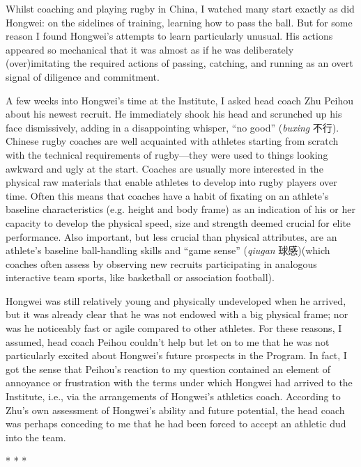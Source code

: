 \begin{CJK}{UTF8}{gbsn}
Whilst coaching and playing rugby in China, I watched many start exactly as did Hongwei: on the sidelines of training, learning how to pass the ball.  But for some reason I found Hongwei’s attempts to learn particularly unusual.  His actions appeared so mechanical that it was almost as if he was deliberately (over)imitating the required actions of passing, catching, and running as an overt signal of diligence and commitment.

A few weeks into Hongwei’s time at the Institute, I asked head coach Zhu Peihou about his newest recruit.  He immediately shook his head and scrunched up his face dismissively, adding in a disappointing whisper, ``no good'' (\textit{buxing} 不行).  Chinese rugby coaches are well acquainted with athletes starting from scratch with the technical requirements of rugby---they were used to things looking awkward and ugly at the start.  Coaches are usually more interested in the physical raw materials that enable athletes to develop into rugby players over time.  Often this means that coaches have a habit of fixating on an athlete's baseline characteristics (e.g. height and body frame) as an indication of his or her capacity to develop the physical speed, size and strength deemed crucial for elite performance.  Also important, but less crucial than physical attributes, are an athlete’s baseline ball-handling skills and ``game sense'' (\textit{qiugan} 球感)(which coaches often assess by observing new recruits participating in analogous interactive team sports, like basketball or association football).

Hongwei was still relatively young and physically undeveloped when he arrived, but it was already clear that he was not endowed with a big physical frame; nor was he noticeably fast or agile compared to other athletes.  For these reasons, I assumed, head coach Peihou couldn’t help but let on to me that he was not particularly excited about Hongwei's future prospects in the Program.  In fact, I got the sense that Peihou's reaction to my question contained an element of annoyance or frustration with the terms under which Hongwei had arrived to the Institute, i.e., via the arrangements of Hongwei’s athletics coach.  According to Zhu's own assessment of Hongwei's ability and future potential, the head coach was perhaps conceding to me that he had been forced to accept an athletic dud into the team.

                        \begin{center}
                          * * *
                        \end{center}


\end{CJK}
